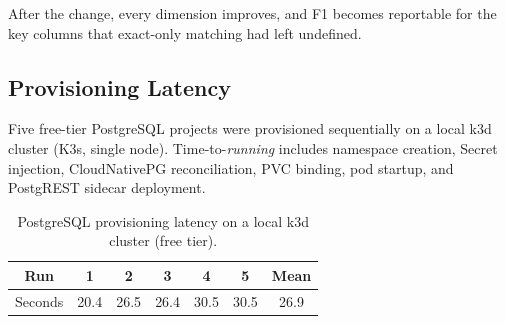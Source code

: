 \documentclass[twoside,twocolumn,10pt]{article}
\begin{document}
\begin{table}[htbp]
\centering
\caption{Schema generation quality before and after extending primary- and foreign-key matching with approximate string matching.}
\label{tab:schema_eval}
\renewcommand{\arraystretch}{1.2}
\setlength{\tabcolsep}{3pt}
\end{table}

After the change, every dimension improves, and F1 becomes reportable for the key columns that exact-only matching had left undefined.

\subsection{Provisioning Latency}

Five free-tier PostgreSQL projects were provisioned sequentially on a local k3d cluster (K3s, single node). Time-to-\textit{running} includes namespace creation, Secret injection, CloudNativePG reconciliation, PVC binding, pod startup, and PostgREST sidecar deployment.

\begin{table}[htbp]
\centering
\caption{PostgreSQL provisioning latency on a local k3d cluster (free tier).}
\label{tab:provisioning}
\renewcommand{\arraystretch}{1.2}
\setlength{\tabcolsep}{5pt}
\begin{tabular}{c c c c c c c}
\toprule
\textbf{Run} & 1 & 2 & 3 & 4 & 5 & \textbf{Mean} \\
\midrule
Seconds & 20.4 & 26.5 & 26.4 & 30.5 & 30.5 & 26.9 \\
\bottomrule
\end{tabular}
\end{table}
\end{document}
